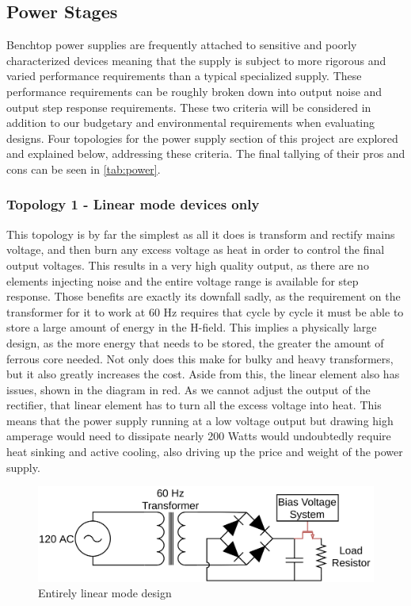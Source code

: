 \documentclass[12pt]{article}
\begin{document}
    
\subsection{Power Stages}
Benchtop power supplies are frequently attached to sensitive and poorly 
characterized devices meaning that the supply is subject to more rigorous 
and varied performance requirements than a typical specialized supply. 
These performance requirements can be roughly broken down into output noise 
and output step response requirements. These two criteria will be considered 
in addition to our budgetary and environmental requirements when evaluating 
designs. Four topologies for the power supply section of this project are 
explored and explained below, addressing these criteria. The final tallying 
of their pros and cons can be seen in \autoref{tab:power}.

\subsubsection{Topology 1 - Linear mode devices only}
This topology is by far the simplest as all it does is transform and rectify mains 
voltage, and then burn any excess voltage as heat in order to control the final 
output voltages. This results in a very high quality output, as there are no elements 
injecting noise and the entire voltage range is available for step response. 
Those benefits are exactly its downfall sadly, as the requirement on the transformer 
for it to work at 60 Hz requires that cycle by cycle it must be able to store a 
large amount of energy in the H-field. This implies a physically large design, as 
the more energy that needs to be stored, the greater the amount of ferrous core needed. 
Not only does this make for bulky and heavy transformers, but it also greatly increases 
the cost. Aside from this, the linear element also has issues, shown in the diagram 
in red. As we cannot adjust the output of the rectifier, that linear element has to 
turn all the excess voltage into heat. This means that the power supply running at 
a low voltage output but drawing high amperage would need to dissipate nearly 200 
Watts would undoubtedly require heat sinking and active cooling, also driving up 
the price and weight of the power supply.

\begin{figure}[H]
    \includegraphics[width=\textwidth]{linear}
    \caption{Entirely linear mode design}
    \label{fig:linear}
\end{figure}
\end{document}
